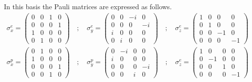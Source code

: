 In this basis the Pauli matrices are expressed as follows.
\begin{equation}
  \begin{split}
    \sigma^e_x=\left(\begin{array}{cccc}
    0 & 0 & 1 & 0 \\
    0 & 0 & 0 & 1 \\
    1 & 0 & 0 & 0 \\
    0 & 1 & 0 & 0
    \end{array}\right)\quad;\quad
    \sigma^e_y=\left(\begin{array}{cccc}
    0 & 0 & -i & 0 \\
    0 & 0 & 0 & -i \\
    i & 0 & 0 & 0 \\
    0 & i & 0 & 0
    \end{array}\right)\quad;\quad
    \sigma^e_z=\left(\begin{array}{cccc}
    1 & 0 & 0 & 0 \\
    0 & 1 & 0 & 0 \\
    0 & 0 & -1 & 0 \\
    0 & 0 & 0 & -1
    \end{array}\right)\\
    \sigma^p_x=\left(\begin{array}{cccc}
    0 & 1 & 0 & 0 \\
    1 & 0 & 0 & 0 \\
    0 & 0 & 0 & 1 \\
    0 & 0 & 1 & 0
    \end{array}\right)\quad;\quad
    \sigma^p_y=\left(\begin{array}{cccc}
    0 & -i & 0 & 0 \\
    i & 0 & 0 & 0 \\
    0 & 0 & 0 & -i \\
    0 & 0 & i & 0
    \end{array}\right)\quad;\quad
    \sigma^e_z=\left(\begin{array}{cccc}
    1 & 0 & 0 & 0 \\
    0 & -1 & 0 & 0 \\
    0 & 0 & 1 & 0 \\
    0 & 0 & 0 & -1
    \end{array}\right)
  \end{split}
\end{equation}





